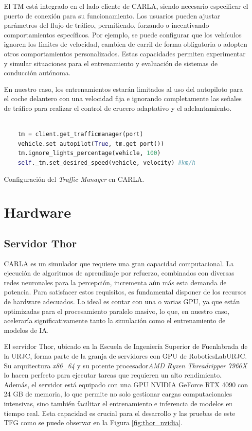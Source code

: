 El \ac{TM} está integrado en el lado cliente de CARLA, siendo necesario especificar el puerto de conexión para su funcionamiento. Los usuarios pueden ajustar parámetros del flujo de tráfico, permitiendo, forzando o incentivando comportamientos específicos. Por ejemplo, se puede configurar que los vehículos ignoren los límites de velocidad, cambien de carril de forma obligatoria o adopten otros comportamientos personalizados. Estas capacidades permiten experimentar y simular situaciones para el entrenamiento y evaluación de sistemas de conducción autónoma.

En nuestro caso, los entrenamientos estarán limitados al uso del autopiloto para el coche delantero con una velocidad fija e ignorando completamente las señales de tráfico para realizar el control de crucero adaptativo y el adelantamiento. 

\begin{code}[h]
	\begin{lstlisting}[language=python]
	
	tm = client.get_trafficmanager(port)
	vehicle.set_autopilot(True, tm.get_port())  
	tm.ignore_lights_percentage(vehicle, 100) 
	self._tm.set_desired_speed(vehicle, velocity) #km/h
\end{lstlisting}
\caption[Configuración del \textit{Traffic Manager} en CARLA]{Configuración del \textit{Traffic Manager} en CARLA.}
\label{cod:tm_carla}
\end{code}

\section{Hardware}
\label{sec:hw}
\subsection{Servidor Thor}
\label{sec:thor}

CARLA es un simulador que requiere una gran capacidad computacional. La ejecución de algoritmos de aprendizaje por refuerzo, combinados con diversas redes neuronales para la percepción, incrementa aún más esta demanda de potencia. Para satisfacer estos requisitos, es fundamental disponer de los recursos de hardware adecuados. Lo ideal es contar con una o varias \ac{GPU}, ya que están optimizadas para el procesamiento paralelo masivo, lo que, en nuestro caso, aceleraría significativamente tanto la simulación como el entrenamiento de modelos de \ac{IA}. 

El servidor Thor, ubicado en la Escuela de Ingeniería Superior de Fuenlabrada de la \ac{URJC}, forma parte de la granja de servidores con \ac{GPU} de RoboticsLabURJC. Su arquitectura \textit{x86\_64} y su potente procesador\textit{AMD Ryzen Threadripper 7960X} lo hacen perfecto para ejecutar tareas que requieren un alto rendimiento. Además, el servidor está equipado con una \ac{GPU} NVIDIA GeForce RTX 4090 con 24 GB de memoria, lo que permite no solo gestionar cargas computacionales intensivas, sino también facilitar el entrenamiento e inferencia de modelos en tiempo real. Esta capacidad es crucial para el desarrollo y las pruebas de este \ac{TFG} como se puede observar en la Figura \ref{fig:thor_nvidia}.

